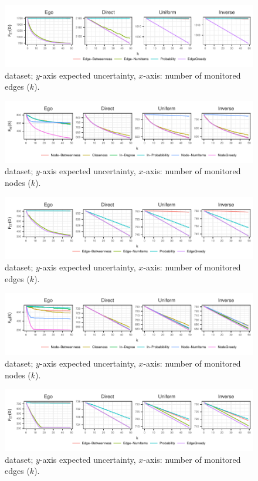 \begin{figure}
\centering
\includegraphics{figures/ass_edges.pdf}
\caption{{\edgeproblem} {\autonomoussystems} dataset; $y$-axis expected uncertainty, 
$x$-axis: number of monitored edges ($k$).}
\label{fig:ass_edges}
\end{figure}

\begin{figure}
\centering
\includegraphics{figures/ba3_nodes.pdf}
\caption{{\nodeproblem} {\ba} dataset; $y$-axis expected uncertainty, 
$x$-axis: number of monitored nodes ($k$).}
\label{fig:ba3_nodes}
\end{figure}

\begin{figure}
\centering
\includegraphics{figures/ba3_edges.pdf}
\caption{{\edgeproblem} {\ba} dataset; $y$-axis expected uncertainty, 
$x$-axis: number of monitored edges ($k$).}
\label{fig:ba3_edges}
\end{figure}

\begin{figure}
\centering
\includegraphics{figures/grid_nodes.pdf}
\caption{{\nodeproblem} {\grid} dataset; $y$-axis expected uncertainty, 
$x$-axis: number of monitored nodes ($k$).}
\label{fig:grid_nodes}
\end{figure}

\begin{figure}
\centering
\includegraphics{figures/grid_edges.pdf}
\caption{{\edgeproblem} {\grid} dataset; $y$-axis expected uncertainty, 
$x$-axis: number of monitored edges ($k$).}
\label{fig:grid_edges}
\end{figure}